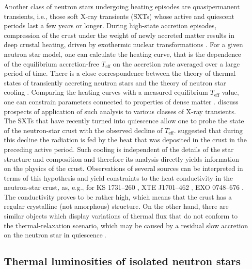 \documentclass[smallextended]{svjour3}       %
\newcommand{\Teff}{T_\mathrm{eff}}
\begin{document}
Another class of neutron stars undergoing heating episodes are
quasipermanent transients, i.e., those soft X-ray transients
(SXTs) whose active and quiescent periods last a few years
or longer. During high-state accretion episodes, compression
of the crust under the weight of newly accreted matter
results in deep crustal heating, driven by exothermic
nuclear transformations \citep{HZ90,HZ08}. For a given
neutron star model, one can calculate the
heating curve, that is the dependence of the equilibrium
accretion-free $\Teff$ on the accretion rate averaged over a
large period of time. There is a close correspondence
between the theory of thermal states of transiently
accreting neutron stars and the theory of neutron star
cooling \citep{YakLH03}. Comparing the heating curves with a
measured equilibrium $\Teff$ value, one can constrain
parameters connected to properties of dense
matter \citep{Yak-ea04,LevenfishHaensel07,Ho11}.
\citet{WijnandsDP13} discuss prospects of application of
such analysis to various classes of X-ray transients. The
SXTs that have recently turned into quiescence allow one to
probe the state of the neutron-star crust with the observed decline of
$\Teff$. \citet{BBR98} suggested that during this decline
the radiation is fed by the heat that was deposited in the
crust in the preceding active period. Such cooling is
independent of the details of the star structure and 
composition and therefore its analysis directly yields
information on the physics of the crust. Observations of
several sources can be interpreted in terms of this
hypothesis and yield constraints to the heat conductivity in
the neutron-star crust, as, e.g., for KS 1731--260
\citep{Shternin-ea07,BC09}, XTE J1701--462
\citep{Fridriksson-ea11,PageReddy13}, EXO 0748--676
\citep{TurlioneAP13}. The conductivity proves to be rather
high, which means that the crust has a regular crystalline
(not amorphous) structure. On the other hand, there are
similar objects which display variations of thermal flux
that do not conform to the thermal-relaxation scenario,
which may be caused by a residual slow accretion on the
neutron star in quiescence
\citep{Rutledge-ea02a,CotiZelati-ea14,TurlioneAP13}.

\subsection{Thermal luminosities of isolated neutron stars}
\end{document}
